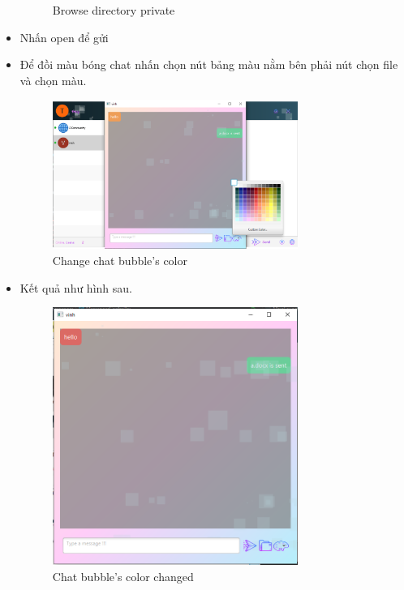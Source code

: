 \documentclass[a4paper]{article}
\begin{document}
\begin{itemize}
\begin{figure}[h!]
\begin{tabular}{c c}
			\end{tabular}
			\caption{Browse directory private}
			\label{fig:my_label}
		\end{figure}
		\item Nhấn open để gửi
		\newpage
		\item Để đồi màu bóng chat nhấn chọn nút bảng màu nằm bên phải nút chọn file và chọn màu.
		\begin{figure}[h!]
			\centering
			\includegraphics[width=8cm]{browse-color.png}
			\caption{Change chat bubble's color}
			\label{fig:my_label}
		\end{figure}
		\item Kết quả như hình sau.
		\begin{figure}[h!]
			\centering
			\includegraphics[width=8cm]{color-changed.PNG}
			\caption{Chat bubble's color changed}
			\label{fig:my_label}
		\end{figure}
	\end{itemize}
	\newpage
\end{document}
